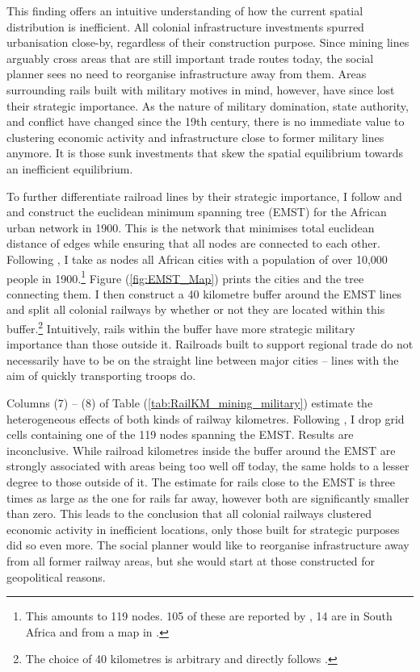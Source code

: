\documentclass[11pt, oneside]{article}   	%
\let\oldref\ref
\renewcommand{\ref}[1]{(\oldref{#1})}
\begin{document}
This finding offers an intuitive understanding of how the current spatial distribution is inefficient. All colonial infrastructure investments spurred urbanisation close-by, regardless of their construction purpose. Since mining lines arguably cross areas that are still important trade routes today, the social planner sees no need to reorganise infrastructure away from them. Areas surrounding rails built with military motives in mind, however, have since lost their strategic importance. As the nature of military domination, state authority, and conflict have changed since the 19th century, there is no immediate value to clustering economic activity and infrastructure close to former military lines anymore. It is those sunk investments that skew the spatial equilibrium towards an inefficient equilibrium.

To further differentiate railroad lines by their strategic importance, I follow \cite{Jedwab_PermanentEffectsTransportation_2016a} and \cite{Faber_TradeIntegrationMarket_2014} and construct the euclidean minimum spanning tree (EMST) for the African urban network in 1900. This is the network that minimises total euclidean distance of edges while ensuring that all nodes are connected to each other. Following \citeauthor{Jedwab_PermanentEffectsTransportation_2016a}, I take as nodes all African cities with a population of over 10,000 people in 1900.\footnote{This amounts to 119 nodes. 105 of these are reported by \cite{Jedwab_PermanentEffectsTransportation_2016a}, 14 are in South Africa and from a map in \cite{Herranz-Loncan_publicbenefitRailways_2017}.} Figure \ref{fig:EMST_Map} prints the cities and the tree connecting them. I then construct a 40 kilometre buffer around the EMST lines and split all colonial railways by whether or not they are located within this buffer.\footnote{The choice of 40 kilometres is arbitrary and directly follows \cite{Jedwab_PermanentEffectsTransportation_2016a}.} Intuitively, rails within the buffer have more strategic military importance than those outside it. Railroads built to support regional trade do not necessarily have to be on the straight line between major cities -- lines with the aim of quickly transporting troops do.

Columns (7) -- (8) of Table \ref{tab:RailKM_mining_military} estimate the heterogeneous effects of both kinds of railway kilometres. Following \citeauthor{Jedwab_PermanentEffectsTransportation_2016a}, I drop grid cells containing one of the 119 nodes spanning the EMST. Results are inconclusive. While railroad kilometres inside the buffer around the EMST are strongly associated with areas being too well off today, the same holds to a lesser degree to those outside of it. The estimate for rails close to the EMST is three times as large as the one for rails far away, however both are significantly smaller than zero. This leads to the conclusion that all colonial railways clustered economic activity in inefficient locations, only those built for strategic purposes did so even more. The social planner would like to reorganise infrastructure away from all former railway areas, but she would start at those constructed for geopolitical reasons.
\end{document}
